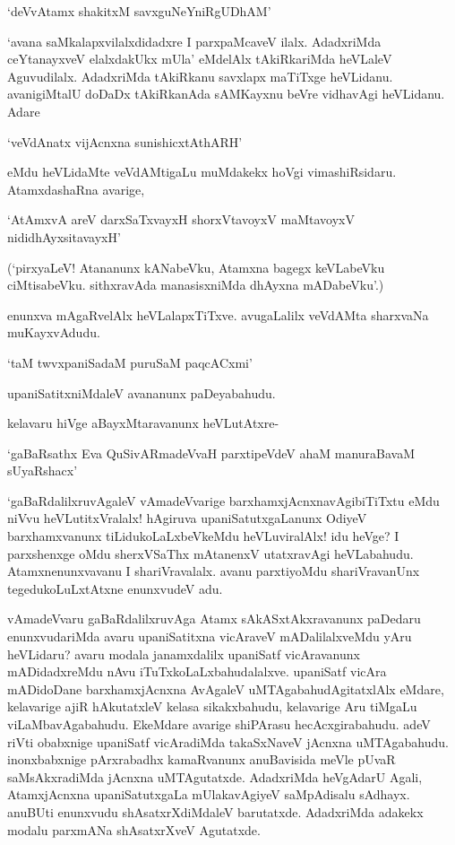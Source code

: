 \begin{shloka}
`deVvAtamx shakitxM savxguNeYniRgUDhAM'
\end{shloka}

`avana saMkalapxvilalxdidadxre I parxpaMcaveV ilalx. AdadxriMda ceYtanayxveV elalxdakUkx mUla' eMdelAlx tAkiRkariMda heVLaleV Aguvudilalx. AdadxriMda tAkiRkanu savxlapx maTiTxge heVLidanu. avanigiMtalU doDaDx tAkiRkanAda sAMKayxnu beVre vidhavAgi heVLidanu. Adare

\begin{shloka}
`veVdAnatx vijAcnxna sunishicxtAthARH'
\end{shloka}

\noindent eMdu heVLidaMte veVdAMtigaLu muMdakekx hoVgi vimashiRsidaru. AtamxdashaRna avarige,

\begin{shloka}
`AtAmxvA areV darxSaTxvayxH shorxVtavoyxV maMtavoyxV nididhAyxsitavayxH'
\end{shloka}

(`pirxyaLeV! Atananunx kANabeVku, Atamxna bagegx keVLabeVku ciMtisabeVku. sithxravAda manasisxniMda dhAyxna mADabeVku'.)

enunxva mAgaRvelAlx heVLalapxTiTxve. avugaLalilx veVdAMta sharxvaNa muKayxvAdudu.

\begin{shloka}
`taM twvxpaniSadaM puruSaM paqcACxmi'
\end{shloka}

upaniSatitxniMdaleV avananunx paDeyabahudu.

kelavaru hiVge aBayxMtaravanunx heVLutAtxre-

\begin{shloka}
`gaBaRsathx Eva QuSivARmadeVvaH parxtipeVdeV ahaM manuraBavaM sUyaRshacx'
\end{shloka}

`gaBaRdalilxruvAgaleV vAmadeVvarige barxhamxjAcnxnavAgibiTiTxtu eMdu niVvu heVLutitxVralalx! hAgiruva upaniSatutxgaLanunx OdiyeV barxhamxvanunx tiLidukoLaLxbeVkeMdu heVLuviralAlx! idu heVge? I parxshenxge oMdu sherxVSaThx mAtanenxV utatxravAgi heVLabahudu. Atamxnenunxvavanu I shariVravalalx. avanu parxtiyoMdu shariVravanUnx tegedukoLuLxtAtxne enunxvudeV adu.

vAmadeVvaru gaBaRdalilxruvAga Atamx sAkASxtAkxravanunx paDedaru enunxvudariMda avaru upaniSatitxna vicAraveV mADalilalxveMdu yAru heVLidaru? avaru modala janamxdalilx upaniSatf vicAravanunx mADidadxreMdu nAvu iTuTxkoLaLxbahudalalxve. upaniSatf vicAra mADidoDane barxhamxjAcnxna AvAgaleV uMTAgabahudAgitatxlAlx eMdare, kelavarige ajiR hAkutatxleV kelasa sikakxbahudu, kelavarige Aru tiMgaLu viLaMbavAgabahudu. EkeMdare avarige shiPArasu hecAcxgirabahudu. adeV riVti obabxnige upaniSatf vicAradiMda takaSxNaveV jAcnxna uMTAgabahudu. inonxbabxnige pArxrabadhx kamaRvanunx anuBavisida meVle pUvaR saMsAkxradiMda jAcnxna uMTAgutatxde. AdadxriMda heVgAdarU Agali, AtamxjAcnxna upaniSatutxgaLa mUlakavAgiyeV saMpAdisalu sAdhayx. anuBUti enunxvudu shAsatxrXdiMdaleV barutatxde. AdadxriMda adakekx modalu parxmANa shAsatxrXveV Agutatxde.

